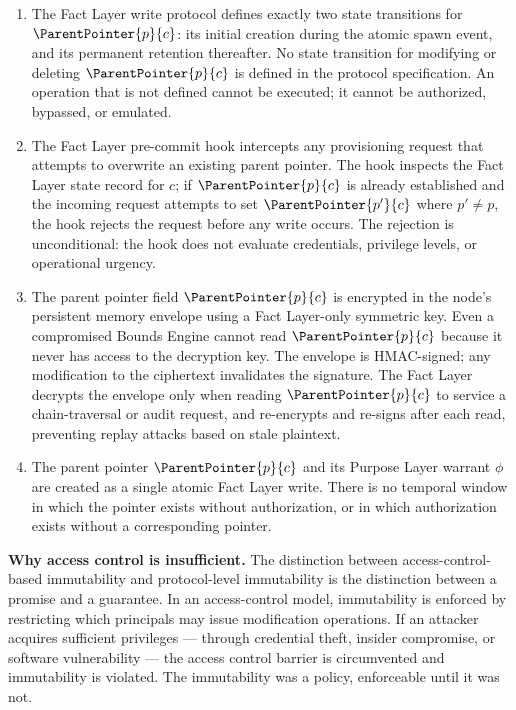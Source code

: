 \begin{enumerate}
    \item[(W1) \textbf{No modification operation defined.}] The Fact Layer write protocol defines exactly two state transitions for $\ParentPointer{p}{c}$: its initial creation during the atomic spawn event, and its permanent retention thereafter. No state transition for modifying or deleting $\ParentPointer{p}{c}$ is defined in the protocol specification. An operation that is not defined cannot be executed; it cannot be authorized, bypassed, or emulated.

    \item[(W2) \textbf{Pre-commit hook rejection.}] The Fact Layer pre-commit hook intercepts any provisioning request that attempts to overwrite an existing parent pointer. The hook inspects the Fact Layer state record for $c$; if $\ParentPointer{p}{c}$ is already established and the incoming request attempts to set $\ParentPointer{p'}{c}$ where $p' \neq p$, the hook rejects the request before any write occurs. The rejection is unconditional: the hook does not evaluate credentials, privilege levels, or operational urgency.

    \item[(W3) \textbf{Sealed memory envelope.}] The parent pointer field $\ParentPointer{p}{c}$ is encrypted in the node's persistent memory envelope using a Fact Layer-only symmetric key. Even a compromised Bounds Engine cannot read $\ParentPointer{p}{c}$ because it never has access to the decryption key. The envelope is HMAC-signed; any modification to the ciphertext invalidates the signature. The Fact Layer decrypts the envelope only when reading $\ParentPointer{p}{c}$ to service a chain-traversal or audit request, and re-encrypts and re-signs after each read, preventing replay attacks based on stale plaintext.

    \item[(W4) \textbf{Atomic provisioning.}] The parent pointer $\ParentPointer{p}{c}$ and its Purpose Layer warrant $\phi$ are created as a single atomic Fact Layer write. There is no temporal window in which the pointer exists without authorization, or in which authorization exists without a corresponding pointer.
\end{enumerate}

\medskip
\noindent\textbf{Why access control is insufficient.} The distinction between access-control-based immutability and protocol-level immutability is the distinction between a promise and a guarantee. In an access-control model, immutability is enforced by restricting which principals may issue modification operations. If an attacker acquires sufficient privileges — through credential theft, insider compromise, or software vulnerability — the access control barrier is circumvented and immutability is violated. The immutability was a policy, enforceable until it was not.

